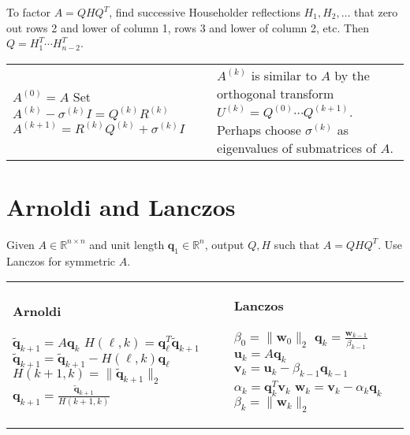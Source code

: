 \documentclass[landscape,10pt,letterpaper]{article}
\newcommand{\heading}[1]{\vspace{-1.5em} \section*{#1} \vspace{-1.0em}}
\begin{document}
\begin{multicols}{4}
To factor $A = QHQ^T$, find successive Householder reflections $H_1, H_2, \ldots$ that zero out rows 2 and lower of column 1, rows 3 and lower of column 2, etc.  Then $Q = H_1^T \cdots H_{n-2}^T$.


\hspace{-0.3in}\begin{tabular}[t]{p{.55\linewidth}@{}p{.45\linewidth}}
\vspace{-1.2em}\begin{algorithmic}[1]
\STATE $A^{(0)} = A$
\FOR{$k = 0,1,2,\ldots$}
	\STATE Set $A^{(k)} - \sigma^{(k)} I = Q^{(k)} R^{(k)}$
	\STATE $A^{(k+1)} = R^{(k)} Q^{(k)} + \sigma^{(k)} I$
\ENDFOR
\end{algorithmic} & 
$A^{(k)}$ is similar to $A$ by the orthogonal transform $U^{(k)} = Q^{(0)} \cdots Q^{(k+1)}$.  Perhaps choose $\sigma^{(k)}$ as eigenvalues of submatrices of $A$.
\end{tabular}

\heading{Arnoldi and Lanczos}

Given $A \in \mathbb{R}^{n \times n}$ and unit length $\mathbf{q}_1 \in \mathbb{R}^{n}$, output $Q, H$ such that $A = QHQ^T$.  Use Lanczos for symmetric $A$.

\hspace{-0.3in}\begin{tabular}[t]{p{.55\linewidth}@{}p{.45\linewidth}} \textbf{Arnoldi}

\begin{algorithmic}[1]
\FOR{$k=1:n-1$}
	\STATE $\tilde{\mathbf{q}}_{k+1} = A \mathbf{q}_k$
	\FOR{$\ell = 1:k$}
		\STATE $H(\ell, k) = \mathbf{q}_\ell^T \tilde{\mathbf{q}}_{k+1}$
		\STATE $\tilde{\mathbf{q}}_{k+1} = \tilde{\mathbf{q}}_{k+1} - H(\ell, k) \mathbf{q}_\ell$
	\ENDFOR
	\STATE $H(k+1, k) = \| \tilde{\mathbf{q}}_{k+1} \|_2$
	\STATE $\mathbf{q}_{k+1} = \frac{\tilde{\mathbf{q}}_{k+1}}{H(k+1, k)}$
\ENDFOR
\end{algorithmic} & \textbf{Lanczos}

\begin{algorithmic}[1]
\STATE $\beta_0 = \| \mathbf{w}_0 \|_2$
\FOR{$k=1,2,\ldots$}
	\STATE $\mathbf{q}_k = \frac{\mathbf{w}_{k-1}}{\beta_{k-1}}$
	\STATE $\mathbf{u}_k = A \mathbf{q}_k$
	\STATE $\mathbf{v}_k = \mathbf{u}_k - \beta_{k-1} \mathbf{q}_{k-1}$ %
	\STATE $\alpha_k = \mathbf{q}_k^T \mathbf{v}_k$
	\STATE $\mathbf{w}_k = \mathbf{v}_k - \alpha_k \mathbf{q}_k$
	\STATE $\beta_k = \| \mathbf{w}_k \|_2$
\ENDFOR
\end{algorithmic} \end{tabular}


\end{multicols}
\end{document}
